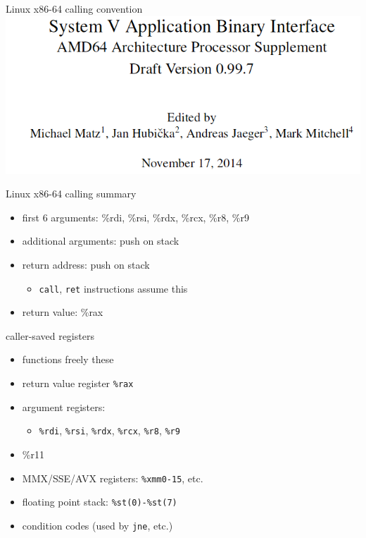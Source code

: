 \usetikzlibrary{arrows.meta,calc,matrix}

\begin{frame}{Linux x86-64 calling convention}
    \includegraphics[width=\textwidth]{../asm/sysv-abi-front}
\end{frame}

\begin{frame}{Linux x86-64 calling summary}
\begin{itemize}
    \item first 6 arguments: \%rdi, \%rsi, \%rdx, \%rcx, \%r8, \%r9
    \item additional arguments: push on stack
    \item return address: push on stack
        \begin{itemize}
        \item {\tt call}, {\tt ret} instructions assume this
        \end{itemize}
    \item return value: \%rax
\end{itemize}
\end{frame}

\begin{frame}{caller-saved registers}
    \begin{itemize}
        \item functions  freely  these
        \vspace{.5cm}
        \item return value register {\tt \%rax}
        \item argument registers: \\
            \begin{itemize}
            \item {\tt \%rdi}, {\tt \%rsi}, {\tt \%rdx}, 
              {\tt \%rcx}, {\tt \%r8}, {\tt \%r9}
              \end{itemize}
        \item \%r11
        \item MMX/SSE/AVX registers: {\tt \%xmm0-15}, etc.
        \item floating point stack: {\tt \%st(0)-\%st(7)}
        \item condition codes (used by {\tt jne}, etc.)
    \end{itemize}
\end{frame}

